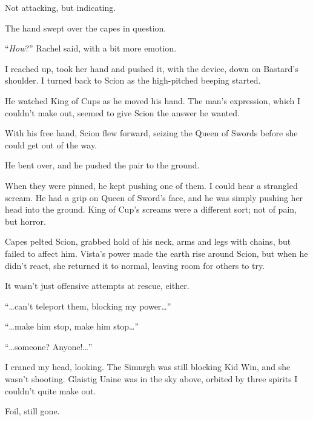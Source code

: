 Not attacking, but indicating.



The hand swept over the capes in question.



``\emph{How}?'' Rachel said, with a bit more emotion.



I reached up, took her hand and pushed it, with the device, down on Bastard's shoulder.  I turned back to Scion as the high-pitched beeping started.



He watched King of Cups as he moved his hand.  The man's expression, which I couldn't make out, seemed to give Scion the answer he wanted.



With his free hand, Scion flew forward, seizing the Queen of Swords before she could get out of the way.



He bent over, and he pushed the pair to the ground.



When they were pinned, he kept pushing one of them.  I could hear a strangled scream.  He had a grip on Queen of Sword's face, and he was simply pushing her head into the ground.  King of Cup's screams were a different sort; not of pain, but horror.



Capes pelted Scion, grabbed hold of his neck, arms and legs with chains, but failed to affect him.  Vista's power made the earth rise around Scion, but when he didn't react, she returned it to normal, leaving room for others to try.



It wasn't just offensive attempts at rescue, either.



``\ldots{}can't teleport them, blocking my power\ldots''



``\ldots{}make him stop, make him stop\ldots''



``\ldots{}someone?  Anyone!\ldots''



I craned my head, looking.  The Simurgh was still blocking Kid Win, and she wasn't shooting.  Glaistig Uaine was in the sky above, orbited by three spirits I couldn't quite make out.



Foil, still gone.



